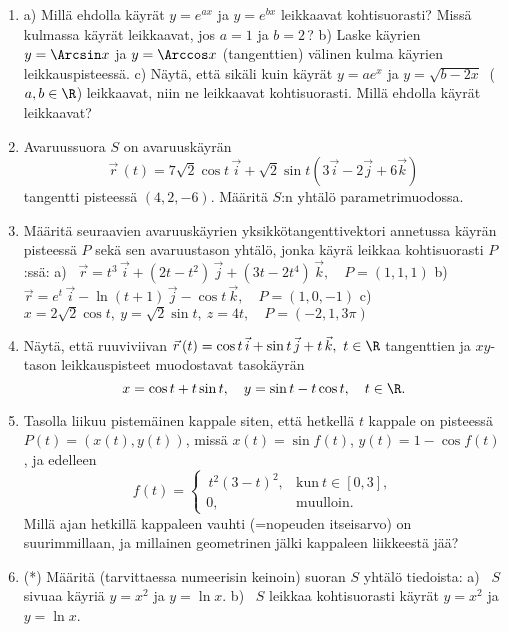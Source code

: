 \begin{enumerate}
\item
a) Millä ehdolla käyrät $y=e^{ax}$ ja $y=e^{bx}$ leikkaavat kohtisuorasti? Missä kulmassa
käyrät leikkaavat, jos $a=1$ ja $b=2$\,? \vspace{1mm}\newline
b) Laske käyrien $y=\Arcsin x$ ja $y=\Arccos x$ (tangenttien) välinen kulma käyrien 
leikkauspisteessä. \vspace{1mm}\newline
c) Näytä, että sikäli kuin käyrät $y=ae^x$ ja $y=\sqrt{b-2x}\ $ ($a,b\in\R$) leikkaavat, niin
ne leikkaavat kohtisuorasti. Millä ehdolla käyrät leikkaavat?

\item
Avaruussuora $S$ on avaruuskäyrän
\[
\vec r\,(t)=7\sqrt{2}\cos t\,\vec i+\sqrt{2}\sin t(3\vec i-2\vec j+6\vec k)
\]
tangentti pisteessä $(4,2,-6)$. Määritä $S$:n yhtälö parametrimuodossa.

\item
Määritä seuraavien avaruuskäyrien yksikkötangenttivektori annetussa käyrän pisteessä $P$ sekä
sen avaruustason yhtälö, jonka käyrä leikkaa kohtisuorasti $P$:ssä: \newline
a) \ $\vec r=t^3\,\vec i+(2t-t^2)\,\vec j+(3t-2t^4)\,\vec k,\quad P=(1,1,1)$ \newline
b) \ $\vec r=e^t\,\vec i-\ln(t+1)\,\vec j-\cos t\,\vec k,\quad P=(1,0,-1)$ \newline
c) \ $x=2\sqrt{2}\cos t,\ y=\sqrt{2}\sin t,\ z=4t,\quad P=(-2,1,3\pi)$

\item
Näytä, että ruuviviivan $\vec r\,(t)=\cos t\,\vec i+\sin t\,\vec j+t\,\vec k,\ t\in\R$
tangenttien ja $xy$-tason leikkauspisteet muodostavat tasokäyrän
\[
x=\cos t+t\sin t, \quad y=\sin t-t\cos t, \quad t\in\R.
\]

\item
Tasolla liikuu pistemäinen kappale siten, että hetkellä $t$ kappale on pisteessä 
$P(t)=(x(t),y(t))$, missä $x(t)=\sin f(t)$, $y(t)=1-\cos f(t)$, ja edelleen 
\[
f(t)=\begin{cases} \,t^2(3-t)^2, &\text{kun}\ t\in[0,3], \\ 0, &\text{muulloin}. \end{cases}
\] 
Millä ajan hetkillä kappaleen vauhti (=nopeuden itseisarvo) on suurimmillaan, ja millainen
geometrinen jälki kappaleen liikkeestä jää?

\item (*)
Määritä (tarvittaessa numeerisin keinoin) suoran $S$ yhtälö tiedoista: \newline
a) \ $S$ sivuaa käyriä $y=x^2$ ja $y=\ln x$. \newline
b) \ $S$ leikkaa kohtisuorasti käyrät $y=x^2$ ja $y=\ln x$.


\end{enumerate}
